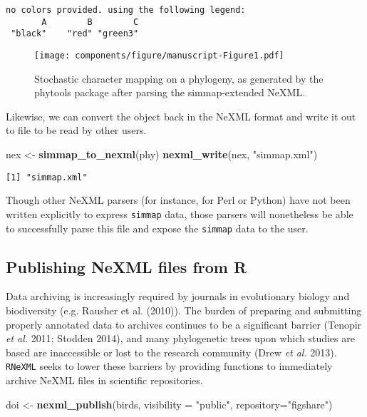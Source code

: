 \documentclass[author-year, review, 11pt]{components/elsarticle} %
\makeatletter
\newenvironment{Shaded}{\begin{snugshade}}{\end{snugshade}}
\newcommand{\KeywordTok}[1]{\textcolor[rgb]{0.13,0.29,0.53}{\textbf{{#1}}}}
\newcommand{\DataTypeTok}[1]{\textcolor[rgb]{0.13,0.29,0.53}{{#1}}}
\newcommand{\StringTok}[1]{\textcolor[rgb]{0.31,0.60,0.02}{{#1}}}
\newcommand{\NormalTok}[1]{{#1}}
\def\maxwidth{\ifdim\Gin@nat@width>\linewidth\linewidth
\else\Gin@nat@width\fi}
\let\Oldincludegraphics\includegraphics
\renewcommand{\includegraphics}[1]{\Oldincludegraphics[width=\maxwidth]{#1}}
\makeatother
\begin{document}
\begin{verbatim}
no colors provided. using the following legend:
       A        B        C 
 "black"    "red" "green3" 
\end{verbatim}

\begin{figure}[htbp]
\centering
\texttt{[image: components/figure/manuscript-Figure1.pdf]}
\caption{Stochastic character mapping on a phylogeny, as generated by
the phytools package after parsing the simmap-extended NeXML.}
\end{figure}

Likewise, we can convert the object back in the NeXML format and write
it out to file to be read by other users.

\begin{Shaded}
\begin{Highlighting}[]
\NormalTok{nex <-}\StringTok{ }\KeywordTok{simmap_to_nexml}\NormalTok{(phy) }
\KeywordTok{nexml_write}\NormalTok{(nex, }\StringTok{"simmap.xml"}\NormalTok{)}
\end{Highlighting}
\end{Shaded}

\begin{verbatim}
[1] "simmap.xml"
\end{verbatim}

Though other NeXML parsers (for instance, for Perl or Python) have not
been written explicitly to express \texttt{simmap} data, those parsers
will nonetheless be able to successfully parse this file and expose the
\texttt{simmap} data to the user.

\subsection{Publishing NeXML files from
R}\label{publishing-nexml-files-from-r}

Data archiving is increasingly required by journals in evolutionary
biology and biodiversity (e.g. Rausher et al. (2010)). The burden of
preparing and submitting properly annotated data to archives continues
to be a significant barrier (Tenopir \emph{et al.} 2011; Stodden 2014),
and many phylogenetic trees upon which studies are based are
inaccessible or lost to the research community (Drew \emph{et al.}
2013). \texttt{RNeXML} seeks to lower these barriers by providing
functions to immediately archive NeXML files in scientific repositories.

\begin{Shaded}
\begin{Highlighting}[]
\NormalTok{doi <-}\StringTok{ }\KeywordTok{nexml_publish}\NormalTok{(birds, }\DataTypeTok{visibility =} \StringTok{"public"}\NormalTok{, }\DataTypeTok{repository=}\StringTok{"figshare"}\NormalTok{)}
\end{Highlighting}
\end{Shaded}
\end{document}
